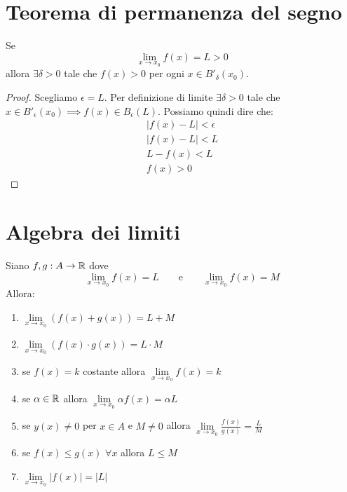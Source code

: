 \section{Teorema di permanenza del segno}

\begin{theorem}
Se 
\begin{equation*}
\lim_{x \to x_0} f(x) = L > 0
\end{equation*}
allora $\exists \delta > 0$ tale che $f(x) > 0$ per ogni $x \in B'_\delta (x_0)$.
\end{theorem}

\begin{proof}
Scegliamo $\epsilon = L$. Per definizione di limite $\exists \delta > 0$ tale che $x \in B'_\epsilon (x_0) \implies f(x) \in B_\epsilon (L)$. Possiamo quindi dire che:
\begin{gather*}
|f(x) - L| < \epsilon \\
|f(x) - L| < L \\
L - f(x) < L \\
f(x) > 0
\end{gather*}
\end{proof}

\section{Algebra dei limiti}

\begin{theorem}
Siano $f, g : A \to \mathbb R$ dove
\begin{equation*}
\lim_{x \to x_0} f(x) = L \qquad \text{e} \qquad \lim_{x \to x_0} f(x) = M
\end{equation*}
Allora:
\begin{enumerate}
\item $\lim\limits_{x \to x_0} (f(x) + g(x)) = L + M$
\item $\lim\limits_{x \to x_0} (f(x) \cdot g(x)) = L \cdot M$
\item se $f(x) = k$ costante allora $\lim\limits_{x \to x_0} f(x) = k$
\item se $\alpha \in \mathbb R$ allora $\lim\limits_{x \to x_0} \alpha f(x) = \alpha L$
\item se $y(x) \neq 0$ per $x \in A$ e $M \neq 0$ allora
$\lim\limits_{x \to x_0} \frac{f(x)}{g(x)} = \frac{L}{M}$
\item se $f(x) \le g(x)$ $\forall x$ allora $L \le M$
\item $\lim\limits_{x \to x_0} |f(x)| = |L|$
\end{enumerate}
\end{theorem}

